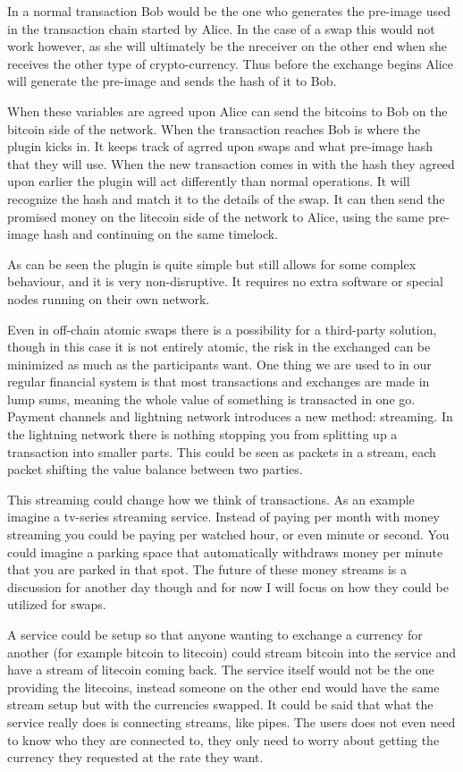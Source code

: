 In a normal transaction Bob would be the one who generates the pre-image used 
in the transaction chain started by Alice. In the case of a swap this would not 
work however, as she will ultimately be the nreceiver on the other end
when she receives the other type of crypto-currency. Thus before the exchange
begins Alice will generate the pre-image and sends the hash of it to Bob.

When these variables are agreed upon Alice can send the bitcoins to Bob on the
bitcoin side of the network. When the transaction reaches Bob is where the plugin
kicks in. It keeps track of agrred upon swaps and what pre-image hash that they
will use. When the new transaction comes in with the hash they agreed upon earlier
the plugin will act differently than normal operations. It will recognize the hash
and match it to the details of the swap. It can then send the promised money on 
the litecoin side of the network to Alice, using the same pre-image hash and 
continuing on the same timelock. 

As can be seen the plugin is quite simple but still allows for some complex 
behaviour, and it is very non-disruptive. It requires no extra software or special
nodes running on their own network. 

Even in off-chain atomic swaps there is a possibility for a third-party solution, 
though in this case it is not entirely atomic, the risk in the exchanged can be 
minimized as much as the participants want. One thing we are used to in our regular
financial system is that most transactions and exchanges are made in lump sums, meaning 
the whole value of something is transacted in one go. Payment channels and lightning network 
introduces a new method: streaming. In the lightning network there is nothing stopping you 
from splitting up a transaction into smaller parts. This could be seen
as packets in a stream, each packet shifting the value balance between two parties. 

This streaming could change how we think of transactions. As an example imagine a tv-series 
streaming service. Instead of paying per month with money streaming you could be paying per 
watched hour, or even minute or second. You could imagine a parking space that automatically
withdraws money per minute that you are parked in that spot. The future of these money streams 
is a discussion for another day though and for now I will focus on how they could be utilized 
for swaps.

A service could be setup so that anyone wanting to exchange a currency for 
another (for example bitcoin to litecoin) could stream bitcoin into the service and have 
a stream of litecoin coming back. The service itself would not be the one providing 
the litecoins, instead someone on the other end would have the same stream setup
but with the currencies swapped. It could be said that what the service really does is 
connecting streams, like pipes. The users does not even need to know who they are 
connected to, they only need to worry about getting the currency they requested 
at the rate they want.


